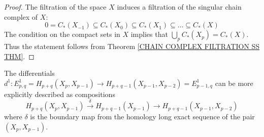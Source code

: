 \begin{proof}
The filtration of the space $X$ induces a filtration of the singular chain complex of $X$:
\[
0  = C_{\ast}(X_{-1}) \subseteq  C_{\ast}(X_{0}) \subseteq C_{\ast}(X_{1}) \subseteq {\dots} \subseteq C_{\ast}(X)
\]
The condition on the compact sets in $X$ implies that 
$\bigcup_{p}C_{\ast}(X_{p}) = C_{\ast}(X)$. Thus the statement follows from   
Theorem \ref{CHAIN COMPLEX FILTRATION SS THM}.
\end{proof}

\begin{note}
The differentials 
$d^{1}\colon E^{1}_{p, q} = H_{p+q}(X_{p}, X_{p-1}) \to 
H_{p+q-1}(X_{p-1}, X_{p-2}) = E^{1}_{p-1, q}$ can be more explicitly described 
as compositions
\[
H_{p+q}(X_{p}, X_{p-1}) \overset{\delta}{\to} H_{p+q-1}(X_{p-1}) 
\to H_{p+q-1}(X_{p-1}, X_{p-2})
\]
where $\delta$ is the boundary map from the homology long exact sequence 
of the pair $(X_{p}, X_{p-1})$.
\end{note}



